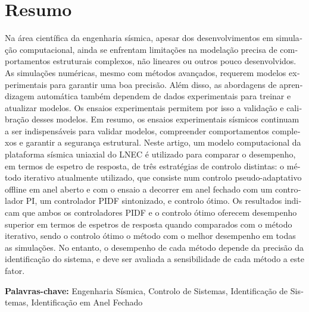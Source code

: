\documentclass[10pt]{extarticle}
\begin{document}

    






\section{Resumo}

\begin{otherlanguage}{portuguese}
Na área científica da engenharia sísmica, apesar dos desenvolvimentos em simulação computacional, ainda se enfrentam limitações na modelação precisa de comportamentos estruturais complexos, não lineares ou outros pouco desenvolvidos. As simulações numéricas, mesmo com métodos avançados, requerem modelos experimentais para garantir uma boa precisão. Além disso, as abordagens de aprendizagem automática também dependem de dados experimentais para treinar e atualizar modelos. Os ensaios experimentais permitem por isso a validação e calibração desses modelos. Em resumo, os ensaios experimentais sísmicos continuam a ser indispensáveis para validar modelos, compreender comportamentos complexos e garantir a segurança estrutural. Neste artigo, um modelo computacional da plataforma sísmica uniaxial do LNEC é utilizado para comparar o desempenho, em termos de espetro de resposta, de três estratégias de controlo distintas: o método iterativo atualmente utilizado, que consiste num controlo pseudo-adaptativo offline em anel aberto e com o ensaio a decorrer em anel fechado com um controlador PI, um controlador PIDF sintonizado, e controlo ótimo. Os resultados indicam que ambos os controladores PIDF e o controlo ótimo oferecem desempenho superior em termos de espetros de resposta quando comparados com o método iterativo, sendo o controlo ótimo o método com o melhor desempenho em todas as simulações. No entanto, o desempenho de cada método depende da precisão da identificação do sistema, e deve ser avaliada a sensibilidade de cada método a este fator.

\vspace{10mm}

\textbf{Palavras-chave:} Engenharia Sísmica, Controlo de Sistemas, Identificação de Sistemas, Identificação em Anel Fechado
\end{otherlanguage}
\clearpage
\end{document}
